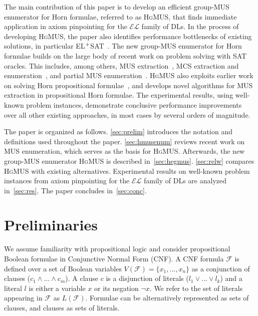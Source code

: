 \documentclass{llncs}
\newcommand{\tn}{\textnormal}
\newcommand{\fml}[1]{{\mathcal{#1}}}
\newcommand{\elplain}{$\fml{EL}$\xspace}
\newcommand{\hgmus}{\textsc{HgMUS}\xspace}
\newcommand{\elsat}{EL$^{\tn{+}}$SAT\xspace}
\newcommand{\set}[1]{\{ #1 \}}
\begin{document}
The main contribution of this paper is to develop an efficient group-MUS 
enumerator for Horn formulae, referred to as \hgmus, that finds
immediate application in axiom pinpointing for the \elplain family of
DLs.
In the process of developing \hgmus, the paper also identifies
performance bottlenecks of existing solutions, in particular
\elsat~\cite{sebastiani-cade09,sebastiani-tr15}.
The new group-MUS enumerator for Horn formulae builds on the large
body of recent work on problem solving with SAT oracles. This
includes, among others, MUS extraction~\cite{blms-aicomm12}, MCS
extraction and enumeration~\cite{mshjpb-ijcai13}, and partial MUS 
enumeration~\cite{pms-aaai13,liffiton-cpaior13,lpmms-cj15}. 
\hgmus also exploits earlier work on solving Horn propositional
formulae~\cite{gallier-jlp84,minoux-ipl88}, and develops novel
algorithms for MUS extraction in propositional Horn formulae.
The experimental results, using well-known problem instances,
demonstrate conclusive performance improvements over all other
existing approaches, in most cases by several orders of magnitude.

The paper is organized as follows. \autoref{sec:prelim} introduces the
notation and definitions used throughout the paper.
\autoref{sec:hmusenum} reviews recent work on MUS enumeration, which
serves as the basis for \hgmus. Afterwards, the new group-MUS
enumerator \hgmus is described in~\autoref{sec:hegmus}.
\autoref{sec:relw} compares \hgmus with existing alternatives.
Experimental results on well-known problem instances from axiom
pinpointing for the \elplain family of DLs are analyzed
in~\autoref{sec:res}. The paper concludes in~\autoref{sec:conc}.



\section{Preliminaries} \label{sec:prelim}

We assume familiarity with propositional logic \cite{sat-handbook09} and consider propositional Boolean formulae in Conjunctive Normal Form (CNF). 
A CNF formula $\fml{F}$ is defined over a set of Boolean variables $V(\fml{F}) = \set{x_1,...,x_n}$ as a conjunction of clauses ($c_1 \land ... \land c_m$). A clause $c$ is a disjunction of literals ($l_{1} \lor ... \lor l_{k}$) and a literal $l$ is either a variable $x$ or its negation $\lnot x$. 
We refer to the set of literals appearing 
in $\fml{F}$ as $L(\fml{F})$. Formulae can be alternatively represented as sets of clauses, and clauses as sets of literals. 
 
\end{document}
